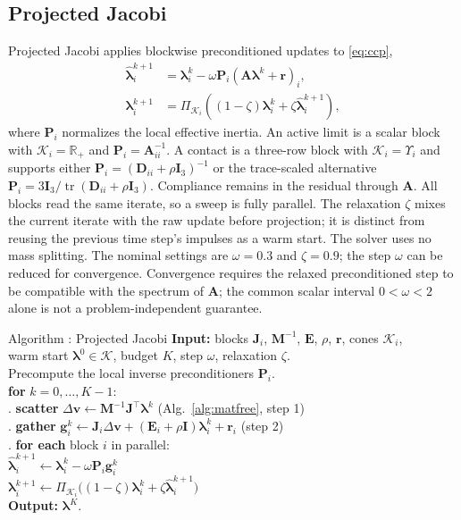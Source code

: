\documentclass{article}
\newcounter{algctr}
\newcommand{\algcaption}[2]{\refstepcounter{algctr}\label{#2}Algorithm \thealgctr: #1}
\newcommand{\M}{\mathbf{M}}
\newcommand{\Jac}{\mathbf{J}}
\newcommand{\Del}{\mathbf{D}}         %
\newcommand{\Ecomp}{\mathbf{E}}       %
\newcommand{\Aop}{\mathbf{A}}         %
\newcommand{\vv}{\mathbf{v}}
\newcommand{\blam}{\boldsymbol{\lambda}}
\newcommand{\rhs}{\mathbf{r}}
\newcommand{\cone}{\Upsilon}
\newcommand{\Kadm}{\mathcal{K}}          %
\newcommand{\Rbb}{\mathbb{R}}
\newcommand{\gvel}{\mathbf{g}}           %
\newcommand{\reg}{\rho}                  %
\newcommand{\Id}{\mathbf{I}}
\theoremstyle{plain}
\theoremstyle{definition}
\begin{document}
\subsection{Projected Jacobi}
\label{sec:jacobi}
Projected Jacobi applies blockwise preconditioned updates to \eqref{eq:ccp},
\begin{equation}
\begin{aligned}
\widehat{\blam}_i^{k+1}
&=\blam_i^k-\omega\mathbf P_i(\Aop\blam^k+\rhs)_i,\\
\blam_i^{k+1}
&=\Pi_{\Kadm_i}\!\left((1-\zeta)\blam_i^k+
\zeta\widehat{\blam}_i^{k+1}\right),
\end{aligned}
\label{eq:jacobi}
\end{equation}
where $\mathbf P_i$ normalizes the local effective inertia. An active limit is
a scalar block with $\Kadm_i=\Rbb_+$ and $\mathbf P_i=\Aop_{ii}^{-1}$.
A contact is a three-row block with $\Kadm_i=\cone_i$ and supports either
$\mathbf P_i=(\Del_{ii}+\reg\Id_3)^{-1}$ or the trace-scaled alternative
$\mathbf P_i=3\Id_3/\operatorname{tr}(\Del_{ii}+\reg\Id_3)$.
Compliance remains in the residual through $\Aop$. All blocks read the same
iterate, so a sweep is fully parallel. The relaxation $\zeta$ mixes the current
iterate with the raw update before projection; it is distinct from reusing the
previous time step's impulses as a warm start. The solver uses no mass splitting.
The nominal settings are $\omega=0.3$ and $\zeta=0.9$; the step $\omega$ can be
reduced for convergence.
Convergence requires the relaxed preconditioned step to be compatible with the
spectrum of $\Aop$; the common scalar interval $0<\omega<2$ alone is not a
problem-independent guarantee.

\begin{algo}{\algcaption{Projected Jacobi}{alg:jacobi}}
\textbf{Input:} blocks $\Jac_i$, $\M^{-1}$, $\Ecomp$, $\reg$, $\rhs$, cones $\Kadm_i$,\\
\quad warm start $\blam^{0}\!\in\Kadm$, budget $K$, step $\omega$, relaxation $\zeta$.\\
Precompute the local inverse preconditioners $\mathbf P_i$.\\
\textbf{for} $k=0,\dots,K-1$:\\
. \textbf{scatter} $\Delta\vv\leftarrow\M^{-1}\Jac^{\top}\blam^{k}$
        \hfill (Alg.~\ref{alg:matfree}, step 1)\\
. \textbf{gather}
        $\gvel_i^{k}\leftarrow\Jac_i\Delta\vv+(\Ecomp_i+\reg\Id)\blam_i^{k}+\rhs_i$
        \hfill (step 2)\\
. \textbf{for each} block $i$ in parallel:\\
\quad\quad $\widehat{\blam}_i^{k+1}\leftarrow\blam_i^k-
        \omega\mathbf P_i\gvel_i^k$\\
\quad\quad $\blam_i^{k+1}\leftarrow\Pi_{\Kadm_i}\!\bigl(
        (1-\zeta)\blam_i^k+\zeta\widehat{\blam}_i^{k+1}\bigr)$\\
\textbf{Output:} $\blam^{K}$.
\end{algo}
\end{document}

